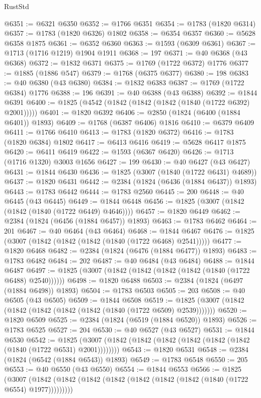 \begin{lexlean}{RustStd}
\begin{coremodule}
@6351 := @6321 @6350
@6352 := @1766 @6351
@6354 := @1783 (@1820 @6314)
@6357 := @1783 (@1820 @6326) @1802
@6358 := @6354 @6357
@6360 := @5628 @6358 @1875
@6361 := @6352 @6360
@6363 := @1593 (@6309 @6361)
@6367 := @1713 (@1716 @1219) @1904 @1911
@6368 := 197
@6371 := @40 @6368 (@43 @6368)
@6372 := @1832 @6371
@6375 := @1769 (@1722 @6372) @1776
@6377 := @1885 (@1886 @547)
@6379 := @1768 (@6375 @6377)
@6380 := 198
@6383 := @40 @6380 (@43 @6380)
@6384 := @1832 @6383
@6387 := @1769 (@1722 @6384) @1776
@6388 := 196
@6391 := @40 @6388 (@43 @6388)
@6392 := @1844 @6391
@6400 := @1825 (@4542 (@1842 (@1842 (@1842 (@1840 (@1722 @6392) @2001)))))
@6401 := @1820 @6392
@6406 := @2850 (@1824 (@6400 (@1884 @6401)) @1893)
@6409 := @1768 (@6387 @6406) @1816
@6410 := @6379 @6409
@6411 := @1766 @6410
@6413 := @1783 (@1820 @6372)
@6416 := @1783 (@1820 @6384) @1802
@6417 := @6413 @6416
@6419 := @5628 @6417 @1875
@6420 := @6411 @6419
@6422 := @1593 (@6367 @6420)
@6426 := @1713 (@1716 @1320) @3003 @1656
@6427 := 199
@6430 := @40 @6427 (@43 @6427)
@6431 := @1844 @6430
@6436 := @1825 (@3007 (@1840 (@1722 @6431) @4689))
@6437 := @1820 @6431
@6442 := @2384 (@1824 (@6436 (@1884 @6437)) @1893)
@6443 := @1783 @6442
@6444 := @1783 @2560
@6445 := 200
@6448 := @40 @6445 (@43 @6445)
@6449 := @1844 @6448
@6456 := @1825 (@3007 (@1842 (@1842 (@1840 (@1722 @6449) @4646))))
@6457 := @1820 @6449
@6462 := @2384 (@1824 (@6456 (@1884 @6457)) @1893)
@6463 := @1783 @6462
@6464 := 201
@6467 := @40 @6464 (@43 @6464)
@6468 := @1844 @6467
@6476 := @1825 (@3007 (@1842 (@1842 (@1842 (@1840 (@1722 @6468) @2541)))))
@6477 := @1820 @6468
@6482 := @2384 (@1824 (@6476 (@1884 @6477)) @1893)
@6483 := @1783 @6482
@6484 := 202
@6487 := @40 @6484 (@43 @6484)
@6488 := @1844 @6487
@6497 := @1825 (@3007 (@1842 (@1842 (@1842 (@1842 (@1840 (@1722 @6488) @2540))))))
@6498 := @1820 @6488
@6503 := @2384 (@1824 (@6497 (@1884 @6498)) @1893)
@6504 := @1783 @6503
@6505 := 203
@6508 := @40 @6505 (@43 @6505)
@6509 := @1844 @6508
@6519 := @1825 (@3007 (@1842 (@1842 (@1842 (@1842 (@1842 (@1840 (@1722 @6509) @2539)))))))
@6520 := @1820 @6509
@6525 := @2384 (@1824 (@6519 (@1884 @6520)) @1893)
@6526 := @1783 @6525
@6527 := 204
@6530 := @40 @6527 (@43 @6527)
@6531 := @1844 @6530
@6542 := @1825 (@3007 (@1842 (@1842 (@1842 (@1842 (@1842 (@1842 (@1840 (@1722 @6531) @2001))))))))
@6543 := @1820 @6531
@6548 := @2384 (@1824 (@6542 (@1884 @6543)) @1893)
@6549 := @1783 @6548
@6550 := 205
@6553 := @40 @6550 (@43 @6550)
@6554 := @1844 @6553
@6566 := @1825
    (@3007 (@1842 (@1842 (@1842 (@1842 (@1842 (@1842 (@1842 (@1840 (@1722 @6554) @1977)))))))))

\end{coremodule}
\end{lexlean}
